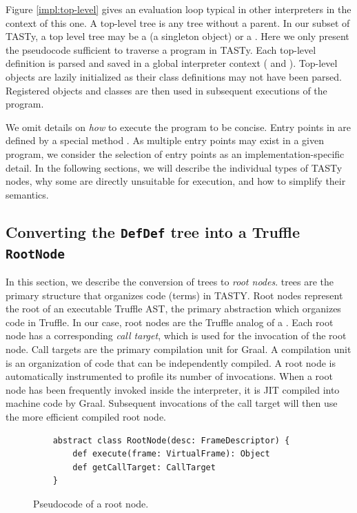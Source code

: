 Figure \ref{impl:top-level} gives an evaluation loop typical in other interpreters in the context of this one.
A top-level tree is any tree without a parent.
In our subset of TASTy, a top level tree may be a  (a singleton object) or a .
Here we only present the pseudocode sufficient to traverse a program in TASTy. 
Each top-level definition is parsed and saved in a global interpreter context ( and ).
Top-level objects are lazily initialized as their class definitions may not have been parsed.
Registered objects and classes are then used in subsequent executions of the program.

We omit details on \textit{how} to execute the program to be concise.
Entry points in  are defined by a special method .
As multiple entry points may exist in a given program, we consider the selection of entry points as an implementation-specific detail.
In the following sections, we will describe the individual types of TASTy nodes, why some are directly unsuitable for execution, and how to simplify their semantics.

\subsection{Converting the \texttt{DefDef} tree into a Truffle \texttt{RootNode}}
\label{impl:subsection:defdef}

In this section, we describe the conversion of  trees to \textit{root nodes}.
 trees are the primary structure that organizes code (terms) in TASTY.
Root nodes represent the root of an executable Truffle AST, the primary abstraction which organizes code in Truffle.
In our case, root nodes are the Truffle analog of a .
Each root node has a corresponding \textit{call target}, which is used for the invocation of the root node.
Call targets are the primary compilation unit for Graal.
A compilation unit is an organization of code that can be independently compiled.
A root node is automatically instrumented\cite{profiling:atom} to profile its number of invocations. 
When a root node has been frequently invoked inside the interpreter, it is JIT compiled into machine code by Graal.
Subsequent invocations of the call target will then use the more efficient compiled root node.

\begin{figure}[!htb]
	\begin{verbatim}
	abstract class RootNode(desc: FrameDescriptor) {
		def execute(frame: VirtualFrame): Object
		def getCallTarget: CallTarget
	}
	\end{verbatim}
	\caption{Pseudocode of a root node.}
	\label{example:root-node}
\end{figure}

